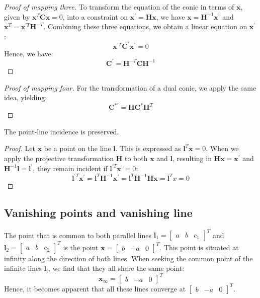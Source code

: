 \begin{proof}[Proof of mapping three]
    To transform the equation of the conic in terms of $\mathbf{x}$, given by $\mathbf{x}^{T}\mathbf{Cx}=0$, into a constraint on $\mathbf{x}^\prime=\mathbf{Hx}$, we have $\mathbf{x}=\mathbf{H}^{-1}\mathbf{x}^\prime$ and $\mathbf{x}^{T}=\mathbf{x}^{\prime T}\mathbf{H}^{-T}$. 
    Combining these three equations, we obtain a linear equation on $\mathbf{x}^\prime$: 
    \[\mathbf{x}^{\prime T}\mathbf{C}^\prime \mathbf{x}^\prime=0\]
    Hence, we have:
    \[\mathbf{C}^\prime=\mathbf{H}^{-T} \mathbf{CH}^{-1}\]
\end{proof}
\begin{proof}[Proof of mapping four]
    For the transformation of a dual conic, we apply the same idea, yielding:
    \[\mathbf{C}^{\ast\prime}=\mathbf{HC}^\ast \mathbf{H}^{T}\]
\end{proof}
The point-line incidence is preserved. 
\begin{proof}
    Let $\mathbf{x}$ be a point on the line $\mathbf{l}$. 
    This is expressed as $\mathbf{l}^T\mathbf{x}=0$. 
    When we apply the projective transformation $\mathbf{H}$ to both $\mathbf{x}$ and $\mathbf{l}$, resulting in $\mathbf{Hx}=\mathbf{x}^\prime$ and $\mathbf{H}^{-1}\mathbf{l}=\mathbf{l}^\prime$, they remain incident if $\mathbf{l}^{\prime T}\mathbf{x}^\prime=0$:
    \[\mathbf{l}^{\prime T}\mathbf{x}^\prime=\mathbf{l}^{T}\mathbf{H}^{-1}\mathbf{x}^\prime=\mathbf{l}^{T}\mathbf{H}^{-1}\mathbf{Hx}=\mathbf{l}^{T}x=0\]
\end{proof}

\subsection{Vanishing points and vanishing line}
The point that is common to both parallel lines $\mathbf{l}_1={\begin{bmatrix} a & b & c_1 \end{bmatrix}}^{T}$ and $\mathbf{l}_2={\begin{bmatrix} a & b & c_2 \end{bmatrix}}^{T}$ is the point $\mathbf{x}={\begin{bmatrix} b & -a & 0 \end{bmatrix}}^{T}$. 
This point is situated at infinity along the direction of both lines.
When seeking the common point of the infinite lines $\mathbf{l}_i$, we find that they all share the same point:
\[\mathbf{x}_{\infty}={\begin{bmatrix} b & -a & 0 \end{bmatrix}}^{T}\]
Hence, it becomes apparent that all these lines converge at ${\begin{bmatrix} b & -a & 0 \end{bmatrix}}^{T}$. 

